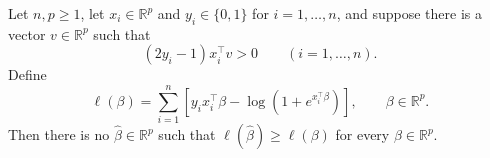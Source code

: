 \begin{theorem}
Let $n,p\ge1$, let $x_i\in\mathbb R^p$ and $y_i\in\{0,1\}$ for
$i=1,\ldots,n$, and suppose there is a vector $v\in\mathbb R^p$ such that
\[
  (2y_i-1)x_i^\top v>0
  \qquad (i=1,\ldots,n).
\]
Define
\[
  \ell(\beta)=\sum_{i=1}^n
  \left[y_i x_i^\top\beta
    -\log\!\left(1+e^{x_i^\top\beta}\right)\right],
  \qquad \beta\in\mathbb R^p.
\]
Then there is no $\widehat\beta\in\mathbb R^p$ such that
$\ell(\widehat\beta)\ge\ell(\beta)$ for every $\beta\in\mathbb R^p$.
\end{theorem}
